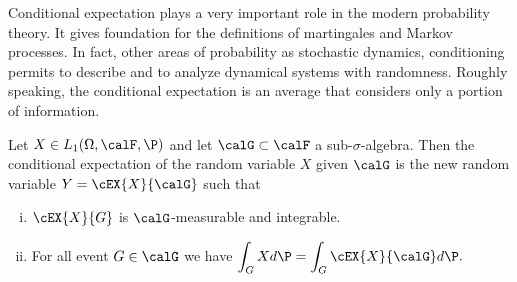 
	Conditional expectation plays a very important role in the modern probability theory. It gives  
foundation for the definitions of martingales and Markov processes. In fact, other areas of probability 
as stochastic dynamics, conditioning permits to describe and to analyze dynamical systems with randomness.
Roughly speaking, the conditional expectation is an average that considers only a portion of information.
\begin{definition}
	Let $X\in L_1(\Omega,\calF,\P)$ and let $\calG \subset \calF$ a sub-$\sigma$-algebra. Then the
	conditional expectation of the random variable $X$ given $\calG$ is the new random variable 
	$Y = \cEX{X}{\calG}$ such that
	\begin{enumerate}[(i)]
		\item
		$\cEX{X}{G}$ is $\calG$-measurable and integrable.
		\item
		For all event $G\in \calG$ we have 
		$
		\displaystyle
		\int_{G} X d\P = \int_{G} \cEX{X}{\calG}d\P.
		$
	\end{enumerate}
\end{definition}	

